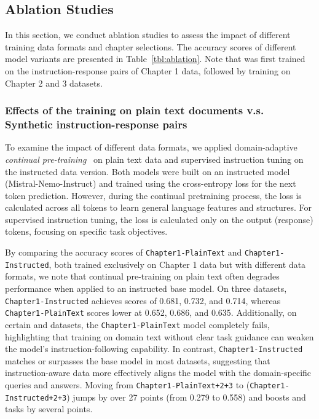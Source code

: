 \subsection{Ablation Studies}

In this section, we conduct ablation studies to assess the impact of different training data formats and chapter selections. The accuracy scores of different model variants are presented in Table~\ref{tbl:ablation}. Note that \modelname was first trained on the instruction-response pairs of Chapter 1 data, followed by training on Chapter 2 and 3 datasets.

\subsubsection{Effects of the training on plain text documents v.s. Synthetic instruction-response pairs} To examine the impact of different data formats, we applied domain-adaptive \emph{continual pre-training}~\citep{ke2023continual} on plain text data and supervised instruction tuning on the instructed data version. Both models were built on an instructed model (Mistral-Nemo-Instruct) and trained using the cross-entropy loss for the next token prediction. However, during the continual pretraining process, the loss is calculated across all tokens to learn general language features and structures. For supervised instruction tuning, the loss is calculated only on the output (response) tokens, focusing on specific task objectives.

By comparing the accuracy scores of \texttt{Chapter1{\footnotesize -PlainText}} and \texttt{Chapter1{\footnotesize -Instructed}}, both trained exclusively on Chapter 1 data but with different data formats, we note that continual pre-training on plain text often degrades performance when applied to an instructed base model. On three \mmlu datasets, \texttt{Chapter1{\footnotesize -Instructed}} achieves scores of 0.681, 0.732, and 0.714, whereas \texttt{Chapter1{\footnotesize -PlainText}} scores lower at 0.652, 0.686, and 0.635. Additionally, on certain \datadiscovery and \texttosql datasets, the \texttt{Chapter1{\footnotesize -PlainText}} model completely fails, highlighting that training on domain text without clear task guidance can weaken the model's instruction-following capability. In contrast, \texttt{Chapter1{\footnotesize -Instructed}} matches or surpasses the base model in most datasets, suggesting that instruction-aware data more effectively aligns the model with the domain-specific queries and answers. 
% 
Moving from \texttt{Chapter1{\footnotesize -PlainText}+2+3} to \modelname (\texttt{Chapter1{\footnotesize - Instructed}+2+3}) jumps \wikipage  by over 27 points (from 0.279 to 0.558) and boosts \mmlu and \texttosql tasks by several points.


